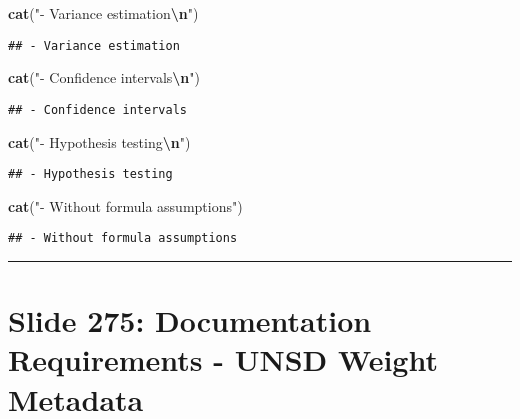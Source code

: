 \documentclass[
]{article}
\newenvironment{Shaded}{\begin{snugshade}}{\end{snugshade}}
\newcommand{\FunctionTok}[1]{\textcolor[rgb]{0.13,0.29,0.53}{\textbf{#1}}}
\newcommand{\NormalTok}[1]{#1}
\newcommand{\SpecialCharTok}[1]{\textcolor[rgb]{0.81,0.36,0.00}{\textbf{#1}}}
\newcommand{\StringTok}[1]{\textcolor[rgb]{0.31,0.60,0.02}{#1}}
\begin{document}
\begin{Shaded}
\begin{Highlighting}[]
\FunctionTok{cat}\NormalTok{(}\StringTok{"{-} Variance estimation}\SpecialCharTok{\textbackslash{}n}\StringTok{"}\NormalTok{)}
\end{Highlighting}
\end{Shaded}

\begin{verbatim}
## - Variance estimation
\end{verbatim}

\begin{Shaded}
\begin{Highlighting}[]
\FunctionTok{cat}\NormalTok{(}\StringTok{"{-} Confidence intervals}\SpecialCharTok{\textbackslash{}n}\StringTok{"}\NormalTok{)}
\end{Highlighting}
\end{Shaded}

\begin{verbatim}
## - Confidence intervals
\end{verbatim}

\begin{Shaded}
\begin{Highlighting}[]
\FunctionTok{cat}\NormalTok{(}\StringTok{"{-} Hypothesis testing}\SpecialCharTok{\textbackslash{}n}\StringTok{"}\NormalTok{)}
\end{Highlighting}
\end{Shaded}

\begin{verbatim}
## - Hypothesis testing
\end{verbatim}

\begin{Shaded}
\begin{Highlighting}[]
\FunctionTok{cat}\NormalTok{(}\StringTok{"{-} Without formula assumptions"}\NormalTok{)}
\end{Highlighting}
\end{Shaded}

\begin{verbatim}
## - Without formula assumptions
\end{verbatim}

\begin{center}\rule{0.5\linewidth}{0.5pt}\end{center}

\section{Slide 275: Documentation Requirements - UNSD Weight
Metadata}\label{slide-275-documentation-requirements---unsd-weight-metadata}
\end{document}
